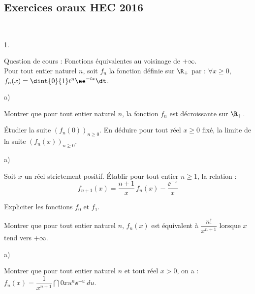 \subsection*{Exercices oraux HEC 2016}


\begin{exerciceAP}~
  \begin{noliste}{1.}
    \setlength{\itemsep}{2mm}
  \item Question de cours : Fonctions équivalentes au voisinage de
    $+\infty$.\\
    Pour tout entier naturel $n$, soit $f_n$ la fonction définie sur
    $\R_+$ par : $\forall x \geq 0$, $f_n(x)=\dint{0}{1} t^n \ee^{-tx}
    \dt$.
  
  \item
    \begin{noliste}{a)}
    \setlength{\itemsep}{2mm}
    \item Montrer que pour tout entier naturel $n$, la fonction 
      $f_n$ est décroissante sur $\R_+$.
      
    \item Étudier la suite $(f_n(0))_{n\geq 0}$. En déduire pour 
      tout réel $x\geq 0$ fixé, la limite de la suite $(f_n(x))_{n\geq 
        0}$.
    \end{noliste}
    
  \item 
    \begin{noliste}{a)}
    \setlength{\itemsep}{2mm}
    \item Soit $x$ un réel strictement positif. Établir pour tout
      entier $n\geq 1$, la relation :
      \[
      f_{n+1}(x)=\dfrac{n+1}{x} \, f_n(x)-\dfrac{\ee^{-x}}{x}
      \]
      
    \item Expliciter les fonctions $f_0$ et $f_1$.
      
    \item Montrer que pour tout entier naturel $n$, $f_n(x)$ est 
      équivalent à $\dfrac{n!}{x^{n+1}}$ lorsque $x$ tend vers $+\infty$.
    \end{noliste}
    
  \item 
    \begin{noliste}{a)}
    \setlength{\itemsep}{2mm}
    \item Montrer que pour tout entier naturel $n$ et tout réel $x>0$,
      on a : $f_n(x)=\dfrac{1}{x^{n+1}}\dint{0}{x} u^n \ee^{-u} \ du$.
    

\end{noliste}
\end{noliste}
\end{exerciceAP}
